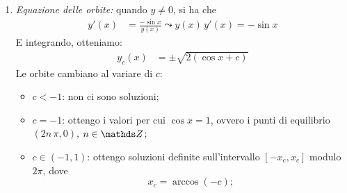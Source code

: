 {\begin{enumerate}
        $\implies$ $ x = k\, \pi $, $ k \in \Z $. 
        \begin{figure}[H]
            \begin{center}
            \end{center}
            \caption{Punti di equilibrio e a tangente orizzontale/verticale per il pendolo senza attrito}
        \end{figure}
        \item \emph{Equazione delle orbite:} quando $ y\neq 0 $, si ha che 
        \begin{align*}
            y'(x) &= \frac{-\sin x}{y(x)}\leadsto y(x)\,y'(x) = -\sin x
        \end{align*}
        E integrando, otteniamo:
        \begin{align*}
            y_{c}(x) &= \pm \sqrt{2\left(\cos x + c\right)} 
        \end{align*}Le orbite cambiano al variare di $ c $: \begin{itemize}
            \item $ c<-1 $: non ci sono soluzioni;
            \item $ c=-1 $: ottengo i valori per cui $ \cos x = 1 $, ovvero i punti di equilibrio $ (2n\,\pi, 0) $, $ n \in \Z $;
            \item $ c \in (-1,1) $: ottengo soluzioni definite sull'intervallo $ [-x_{c}, x_{c}  ] $ modulo $ 2\pi $, dove \[
                x_{c}=\arccos{(-c)};
\]
\end{itemize}
\end{enumerate}}
